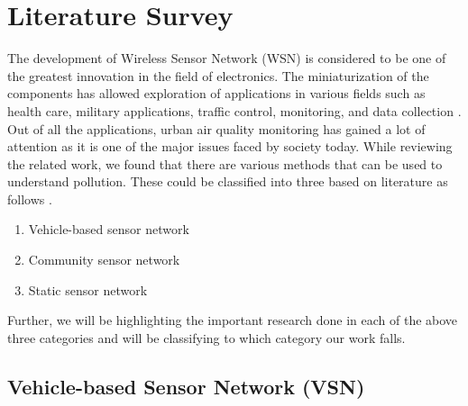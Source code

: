 \chapter{Literature Survey}

The development of Wireless Sensor Network (WSN) is considered to be one of the greatest innovation in the field of electronics. The miniaturization of the components has allowed exploration of applications in various fields such as health care, military applications, traffic control, monitoring, and data collection \cite{Khedo2017} \cite{Liu2017}. Out of all the applications, urban air quality monitoring has gained a lot of attention as it is one of the major issues faced by society today. While reviewing the related work, we found that there are various methods that can be used to understand pollution. These could be classified into three based on literature as follows \cite{Yi2015} \cite{Pavani2017}.




 
\begin{enumerate}

    \item Vehicle-based sensor network
    \item Community sensor network
    \item Static sensor network

 \end{enumerate} 

 Further, we will be highlighting the important research done in each of the above three categories and will be classifying to which category our work falls.

\section{Vehicle-based Sensor Network (VSN)}

